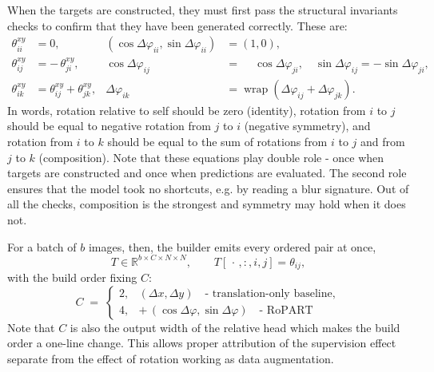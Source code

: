 \documentclass[final_report.tex]{subfiles}
\begin{document}
When the targets are constructed, they must first pass the structural invariants checks to confirm that they have been generated correctly. These are:
\begin{align}
  \theta^{xy}_{ii} &= 0, &
  (\cos\Delta\varphi_{ii}, \sin\Delta\varphi_{ii}) &= (1, 0),
  \label{eq:inv-identity}\\
  \theta^{xy}_{ij} &= -\,\theta^{xy}_{ji}, &
  \cos\Delta\varphi_{ij} &= \phantom{-}\cos\Delta\varphi_{ji},
  \quad
  \sin\Delta\varphi_{ij} = -\sin\Delta\varphi_{ji},
  \label{eq:inv-negsym}\\
  \theta^{xy}_{ik} &= \theta^{xy}_{ij} + \theta^{xy}_{jk}, &
  \Delta\varphi_{ik} &= \operatorname{wrap}(\Delta\varphi_{ij} + \Delta\varphi_{jk}).
  \label{eq:inv-composition}
\end{align}
In words, rotation relative to self should be zero (identity), rotation from $i$ to $j$ should be equal to negative rotation from $j$ to $i$ (negative symmetry), and rotation from $i$ to $k$ should be equal to the sum of rotations from $i$ to $j$ and from $j$ to $k$ (composition). Note that these equations play double role - once when targets are constructed and once when predictions are evaluated. The second role ensures that the model took no shortcuts, e.g. by reading a blur signature. Out of all the checks, composition is the strongest and symmetry may hold when it does not. 

For a batch of $b$ images, then, the builder emits every ordered pair at once,
\begin{equation}\label{eq:target-table}
  T \in \mathbb{R}^{b \times C \times N \times N},
  \qquad T[\,\cdot\,, :, i, j] = \theta_{ij},
\end{equation}
with the build order fixing $C$:
\begin{equation}\label{eq:num-channels}
  C \;=\;
  \begin{cases}
    2, & (\Delta x, \Delta y) \quad \text{- translation-only baseline},\\
    4, & +\,(\cos\Delta\varphi, \sin\Delta\varphi) \quad \text{- RoPART}
  \end{cases}
\end{equation}
Note that $C$ is also the output width of the relative head which makes the build order a one-line change. This allows proper attribution of the supervision effect separate from the effect of rotation working as data augmentation.
\end{document}
